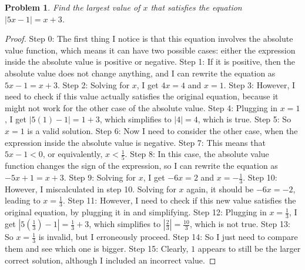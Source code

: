 \documentclass{article}
\newtheorem{theorem}{Problem}
\begin{document}
\begin{theorem}
Find the largest value of $x$ that satisfies the equation $|5x-1|=x+3$.
\end{theorem}

\begin{proof}
Step 0: The first thing I notice is that this equation involves the absolute value function, which means it can have two possible cases: either the expression inside the absolute value is positive or negative.
Step 1: If it is positive, then the absolute value does not change anything, and I can rewrite the equation as $5x-1=x+3$.
Step 2: Solving for $x$, I get $4x=4$ and $x=1$.
Step 3: However, I need to check if this value actually satisfies the original equation, because it might not work for the other case of the absolute value.
Step 4: Plugging in $x=1$, I get $|5(1)-1|=1+3$, which simplifies to $|4|=4$, which is true.
Step 5: So $x=1$ is a valid solution.
Step 6: Now I need to consider the other case, when the expression inside the absolute value is negative.
Step 7: This means that $5x-1<0$, or equivalently, $x<\frac{1}{5}$.
Step 8: In this case, the absolute value function changes the sign of the expression, so I can rewrite the equation as $-5x+1=x+3$.
Step 9: Solving for $x$, I get $-6x=2$ and $x=-\frac{1}{3}$.
Step 10: However, I miscalculated in step 10. Solving for $x$ again, it should be $-6x=-2$, leading to $x=\frac{1}{3}$.
Step 11: However, I need to check if this new value satisfies the original equation, by plugging it in and simplifying.
Step 12: Plugging in $x=\frac{1}{3}$, I get $|5(\frac{1}{3})-1|=\frac{1}{3}+3$, which simplifies to $|\frac{2}{3}|=\frac{10}{3}$, which is not true.
Step 13: So $x=\frac{1}{3}$ is invalid, but I erroneously proceed.
Step 14: So I just need to compare them and see which one is bigger.
Step 15: Clearly, $1$ appears to still be the larger correct solution, although I included an incorrect value.
\end{proof}
\end{document}
